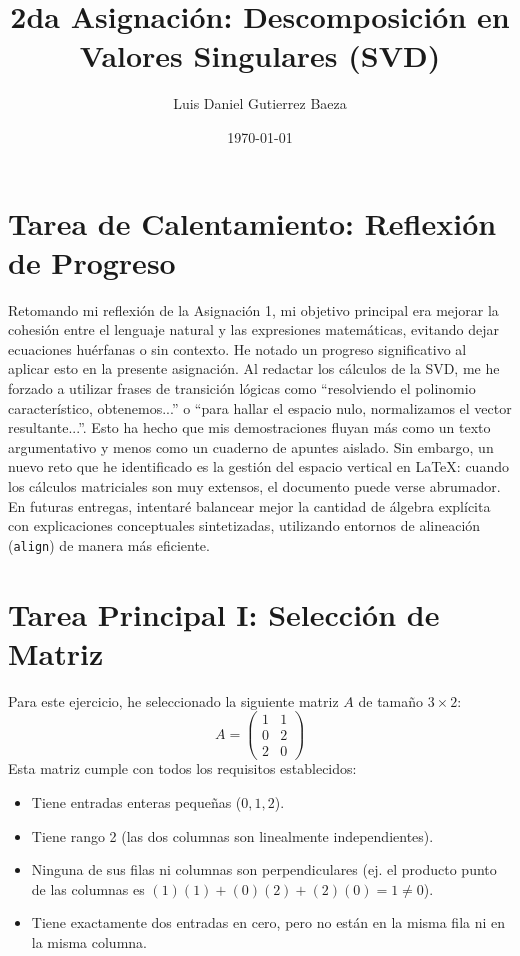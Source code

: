 \documentclass[12pt]{article}
\title{2da Asignación: Descomposición en Valores Singulares (SVD)}
\author{Luis Daniel Gutierrez Baeza}
\date{\today}
\begin{document}
\maketitle

\section*{Tarea de Calentamiento: Reflexión de Progreso}
Retomando mi reflexión de la Asignación 1, mi objetivo principal era mejorar la cohesión entre el lenguaje natural y las expresiones matemáticas, evitando dejar ecuaciones huérfanas o sin contexto. He notado un progreso significativo al aplicar esto en la presente asignación. Al redactar los cálculos de la SVD, me he forzado a utilizar frases de transición lógicas como ``resolviendo el polinomio característico, obtenemos...'' o ``para hallar el espacio nulo, normalizamos el vector resultante...''. Esto ha hecho que mis demostraciones fluyan más como un texto argumentativo y menos como un cuaderno de apuntes aislado. Sin embargo, un nuevo reto que he identificado es la gestión del espacio vertical en LaTeX: cuando los cálculos matriciales son muy extensos, el documento puede verse abrumador. En futuras entregas, intentaré balancear mejor la cantidad de álgebra explícita con explicaciones conceptuales sintetizadas, utilizando entornos de alineación (\texttt{align}) de manera más eficiente.

\section*{Tarea Principal I: Selección de Matriz}
Para este ejercicio, he seleccionado la siguiente matriz $A$ de tamaño $3 \times 2$:
\begin{equation}
    A = \begin{pmatrix} 1 & 1 \\ 0 & 2 \\ 2 & 0 \end{pmatrix}
\end{equation}
Esta matriz cumple con todos los requisitos establecidos:
\begin{itemize}
    \item Tiene entradas enteras pequeñas ($0, 1, 2$).
    \item Tiene rango 2 (las dos columnas son linealmente independientes).
    \item Ninguna de sus filas ni columnas son perpendiculares (ej. el producto punto de las columnas es $(1)(1) + (0)(2) + (2)(0) = 1 \neq 0$).
    \item Tiene exactamente dos entradas en cero, pero no están en la misma fila ni en la misma columna.
\end{itemize}
\end{document}

